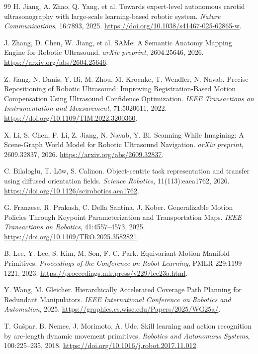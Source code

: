 \documentclass[UTF8,11pt,a4paper,fontset=fandol]{ctexart}
\numberwithin{equation}{section}
\theoremstyle{definition}
\begin{document}
\clearpage
{}
\begin{thebibliography}{99}\small
{}
H. Jiang, A. Zhao, Q. Yang, et al.
Towards expert-level autonomous carotid ultrasonography with large-scale learning-based robotic system.
\emph{Nature Communications}, 16:7893, 2025.
\url{https://doi.org/10.1038/s41467-025-62865-w}.

J. Zhang, D. Chen, W. Jiang, et al.
SAMe: A Semantic Anatomy Mapping Engine for Robotic Ultrasound.
\emph{arXiv preprint}, 2604.25646, 2026.
\url{https://arxiv.org/abs/2604.25646}.

Z. Jiang, N. Danis, Y. Bi, M. Zhou, M. Kroenke, T. Wendler, N. Navab.
Precise Repositioning of Robotic Ultrasound: Improving Registration-Based Motion Compensation Using Ultrasound Confidence Optimization.
\emph{IEEE Transactions on Instrumentation and Measurement}, 71:5020611, 2022.
\url{https://doi.org/10.1109/TIM.2022.3200360}.

X. Li, S. Chen, F. Li, Z. Jiang, N. Navab, Y. Bi.
Scanning While Imagining: A Scene-Graph World Model for Robotic Ultrasound Navigation.
\emph{arXiv preprint}, 2609.32837, 2026.
\url{https://arxiv.org/abs/2609.32837}.

C. Bilaloglu, T. L\"ow, S. Calinon.
Object-centric task representation and transfer using diffused orientation fields.
\emph{Science Robotics}, 11(113):eaea1762, 2026.
\url{https://doi.org/10.1126/scirobotics.aea1762}.

G. Franzese, R. Prakash, C. Della Santina, J. Kober.
Generalizable Motion Policies Through Keypoint Parameterization and Transportation Maps.
\emph{IEEE Transactions on Robotics}, 41:4557--4573, 2025.
\url{https://doi.org/10.1109/TRO.2025.3582821}.

B. Lee, Y. Lee, S. Kim, M. Son, F. C. Park.
Equivariant Motion Manifold Primitives.
\emph{Proceedings of the Conference on Robot Learning}, PMLR 229:1199--1221, 2023.
\url{https://proceedings.mlr.press/v229/lee23a.html}.

Y. Wang, M. Gleicher.
Hierarchically Accelerated Coverage Path Planning for Redundant Manipulators.
\emph{IEEE International Conference on Robotics and Automation}, 2025.
\url{https://graphics.cs.wisc.edu/Papers/2025/WG25a/}.

T. Ga\v{s}par, B. Nemec, J. Morimoto, A. Ude.
Skill learning and action recognition by arc-length dynamic movement primitives.
\emph{Robotics and Autonomous Systems}, 100:225--235, 2018.
\url{https://doi.org/10.1016/j.robot.2017.11.012}.


\end{thebibliography}
\end{document}
